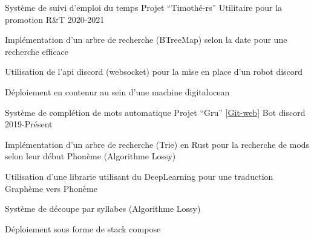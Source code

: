 \begin{cventries}
  \cventry
    {Système de suivi d'emploi du temps}
    {Projet ``Timothé-rs'' \href{https://github.com/MatthieuCoder/Timothe-rs.git}{\faGithubSquare}}
    {Utilitaire pour la promotion R\&T}
    {2020-2021}
    {
      \begin{cvitems}
        \item {Implémentation d'un arbre de recherche (BTreeMap) selon la date pour une recherche efficace} 
        \item {Utilisation de l'api discord (websocket) pour la mise en place d'un robot discord}
        \item {Déploiement en contenur au sein d'une machine digitalocean}
      \end{cvitems}
    }
  \cventry
    {Système de complétion de mots automatique}
    {Projet ``Gru'' [\href{https://git.puffer.fish/?p=matthieu/gru.git;a=summary}{Git-web}]}
    {Bot discord}
    {2019-Présent}
    {
      \begin{cvitems}
        \item {Implémentation d'un arbre de recherche (Trie) en Rust pour la recherche de mods selon leur début Phonème (Algorithme Lossy)} 
        \item {Utilisation d'une librarie utilisant du DeepLearning pour une traduction Graphème vers Phonème}
        \item {Système de découpe par syllabes (Algorithme Lossy)}
        \item {Déploiement sous forme de stack compose}
      \end{cvitems}
    }
\end{cventries}
